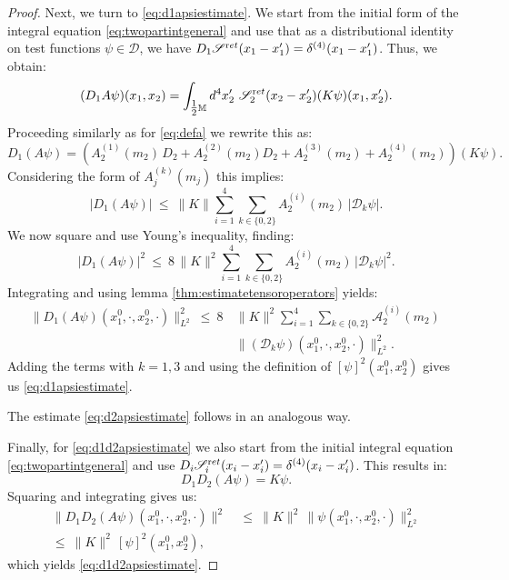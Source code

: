 \documentclass[b5paper,draft,openbib,12pt]{memoir}
\newcommand{\M}{\mathbb{M}}
\newcommand{\ret}{{\textup ret}}
\begin{document}
\begin{proof}
Next, we turn to \eqref{eq:d1apsiestimate}. We start from the initial 
form of the integral equation \eqref{eq:twopartintgeneral} and use that as a 
distributional identity on test functions $\psi \in \mathscr{D}$, 
we have $D_1 \mathscr{S}^\ret(x_1-x_1') = \delta^{(4)}(x_1-x_1')$. Thus, we 
obtain:
\begin{equation}
	(D_1 A \psi)(x_1,x_2) = \int_{\tfrac{1}{2} \M} d^4 x_2' ~\mathscr{S}_2^\ret(x_2-x_2') (K \psi)(x_1,x_2').
\end{equation}
Proceeding similarly as for \eqref{eq:defa} we rewrite this as:
\begin{equation}
	D_1 (A \psi)\! =\! \left( A_2^{(1)}(m_2)\, D_2\! +\! A_2^{(2)}(m_2) D_2 \!+\! A_2^{(3)}(m_2) \!+\! A_2^{(4)}(m_2)\right)\! (K\psi).
\end{equation}
Considering the form of $A_j^{(k)}(m_j)$ this implies:
\begin{equation}
	|D_1 (A \psi)| ~\leq~  \| K \| \sum_{i=1}^4 \sum_{k\in \{ 0,2\}} A_2^{(i)}(m_2)\, |\mathcal{D}_k \psi|.
\end{equation}
We now square and use Young's inequality, finding:
\begin{equation}
	|D_1 (A \psi)|^2 ~\leq~  8 \, \| K \|^2 \sum_{i=1}^4 \sum_{k\in \{ 0,2\}} A_2^{(i)}(m_2) \, | \mathcal{D}_k \psi|^2.
\end{equation}
Integrating and using lemma \ref{thm:estimatetensoroperators} yields:
\begin{align}\nonumber
  \| D_1 (A \psi)(x_1^0,\cdot,x_2^0,\cdot)\|^2_{L^2} ~\leq~ 8 \, &\| K \|^2 \sum_{i=1}^4 \sum_{k\in \{ 0,2\}} \mathcal{A}_2^{(i)}(m_2)\,\\
  & \| (\mathcal{D}_k \psi)(x_1^0,\cdot,x_2^0,\cdot) \|^2_{L^2}.
\end{align}
Adding the terms with $k=1,3$ and using the definition of 
$[\psi]^2(x_1^0,x_2^0)$ gives us \eqref{eq:d1apsiestimate}.

The estimate \eqref{eq:d2apsiestimate} follows in an analogous way.

Finally, for \eqref{eq:d1d2apsiestimate} we also start from the 
initial integral equation \eqref{eq:twopartintgeneral} and use 
$D_i \mathscr{S}_i^\ret(x_i-x_i') = \delta^{(4)}(x_i-x_i')$. This results in:
\begin{equation}
	D_1 D_2 (A \psi) = K \psi.
\end{equation}
Squaring and integrating gives us:
\begin{align}\nonumber
  \| D_1 D_2 (A \psi)(x_1^0,\cdot,x_2^0,\cdot) \|^2 ~ &\leq ~\| K \|^2 \, \| \psi(x_1^0,\cdot,x_2^0,\cdot) \|^2_{L^2} \\
  \leq~ \| K \|^2 \, [\psi]^2(x_1^0,x_2^0),
\end{align}
which yields \eqref{eq:d1d2apsiestimate}. 
\end{proof}
\end{document}
